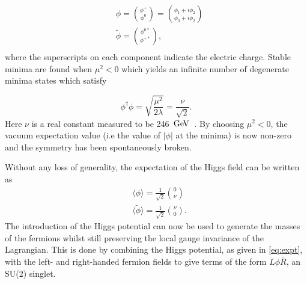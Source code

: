 \begin{equation}
  \begin{split}
    &
    \phi = \binom{\phi^{+}}{\phi^{0}}  = \binom{\phi_{1} + i\phi_{2}}{\phi_{3} + i\phi_{2}}\\
    &
    \tilde{\phi} = \binom{\phi^{0*}}{\phi^{+*}},\\
    \end{split}
  \label{eq:higgsspin_1}
\end{equation}
where the superscripts on each component indicate the electric charge. %
Stable minima are found when $\mu^{2}<0$ which yields an infinite number of degenerate minima states which satisfy

\begin{equation}
 \phi^\dagger\phi =  \sqrt{\frac{\mu^{2}}{2\lambda}} = \frac{\nu}{\sqrt{2}}.
\end{equation}
Here $\nu$ is a real constant measured to be 246 $\mathrm{\,Ge\kern -0.1em V}$~\cite{pdg}. By choosing $\mu^{2}<0$, the vacuum expectation value (i.e the value of $|\phi|$ at the minima) is now non-zero and the symmetry has been spontaneously broken. %

 Without any loss of generality, the expectation of the Higgs field can be written as
 \begin{equation}
   \label{eq:expt}
   \begin{split}
     & \langle{\phi}\rangle = \frac{1}{\sqrt{2}}\binom{0}{\nu} \\ %
     &\langle\tilde{\phi}\rangle = \frac{1}{\sqrt{2}}\binom{\nu}{0}.
   \end{split}
\end{equation}
The introduction of the Higgs potential can now be used to generate the masses of the fermions whilst still preserving the local gauge invariance of the Lagrangian. This is done by combining the Higgs potential, as given in \autoref{eq:expt}, with the left- and right-handed fermion fields to give terms of the form $L\phi\overline{R}$,  an SU(2) singlet.%

